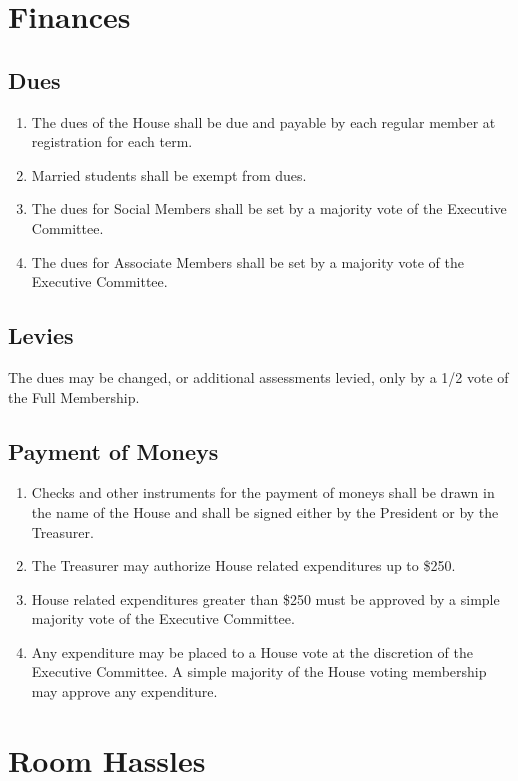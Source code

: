 \documentclass[10pt]{article} %
\begin{document}
\section{Finances}
\subsection{Dues}
\begin{enumerate}
\item The dues of the House shall be due and payable by each regular member at registration for each term. 
\item Married students shall be exempt from dues.
\item The dues for Social Members shall be set by a majority vote of the Executive Committee.
\item The dues for Associate Members shall be set by a majority vote of the Executive Committee.
\end{enumerate}
\subsection{Levies}
The dues may be changed, or additional assessments levied, only by a 1/2 vote of the Full Membership.
\subsection{Payment of Moneys}
\begin{enumerate}
\item Checks and other instruments for the payment of moneys shall be drawn in the name of the House and shall be signed either by the President or by the Treasurer.
\item The Treasurer may authorize House related expenditures up to \$250.
\item House related expenditures greater than \$250 must be approved by a simple majority vote of the Executive Committee.
\item Any expenditure may be placed to a House vote at the discretion of the Executive Committee. A simple majority of the House voting membership may approve any expenditure.
\end{enumerate}
\section{Room Hassles}
\end{document}
